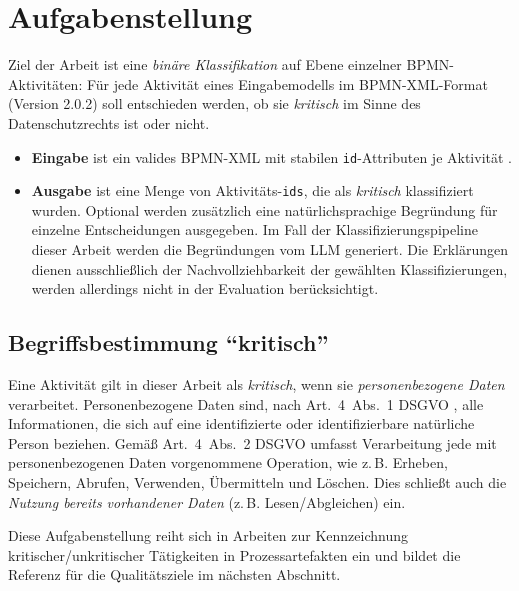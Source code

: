 \section{Aufgabenstellung}\label{sec:aufgabenstellung}

Ziel der Arbeit ist eine \emph{binäre Klassifikation} auf Ebene einzelner \ac{BPMN}-Aktivitäten: Für jede Aktivität eines Eingabemodells im \ac{BPMN}-XML-Format (Version 2.0.2) \cite{omgbpmn} soll entschieden werden, ob sie \emph{kritisch} im Sinne des Datenschutzrechts ist oder nicht.

\begin{itemize}
    \item \textbf{Eingabe} ist ein valides \ac{BPMN}-XML mit stabilen \texttt{id}-Attributen je Aktivität \cite{omgbpmn}.
    \item \textbf{Ausgabe} ist eine Menge von Aktivitäts-\texttt{ids}, die als \emph{kritisch} klassifiziert wurden. Optional werden zusätzlich eine natürlichsprachige Begründung für einzelne Entscheidungen ausgegeben. Im Fall der Klassifizierungspipeline dieser Arbeit werden die Begründungen vom \ac{LLM} generiert. Die Erklärungen dienen ausschließlich der Nachvollziehbarkeit der gewählten Klassifizierungen, werden allerdings nicht in der Evaluation berücksichtigt.
\end{itemize}

\subsection*{Begriffsbestimmung \enquote{kritisch}}

Eine Aktivität gilt in dieser Arbeit als \emph{kritisch}, wenn sie \emph{personenbezogene Daten} verarbeitet. Personenbezogene Daten sind, nach Art.~4~Abs.~1 \ac{DSGVO} \cite{GDPR2016}, alle Informationen, die sich auf eine identifizierte oder identifizierbare natürliche Person beziehen. Gemäß Art.~4~Abs.~2 \ac{DSGVO} \cite{GDPR2016} umfasst Verarbeitung jede mit personenbezogenen Daten vorgenommene Operation, wie z.\,B. Erheben, Speichern, Abrufen, Verwenden, Übermitteln und Löschen. Dies schließt auch die \emph{Nutzung bereits vorhandener Daten} (z.\,B. Lesen/Abgleichen) ein.

Diese Aufgabenstellung reiht sich in Arbeiten zur Kennzeichnung kritischer/unkritischer Tätigkeiten in Prozessartefakten ein und bildet die Referenz für die Qualitätsziele im nächsten Abschnitt. \cite{nake2023towards}